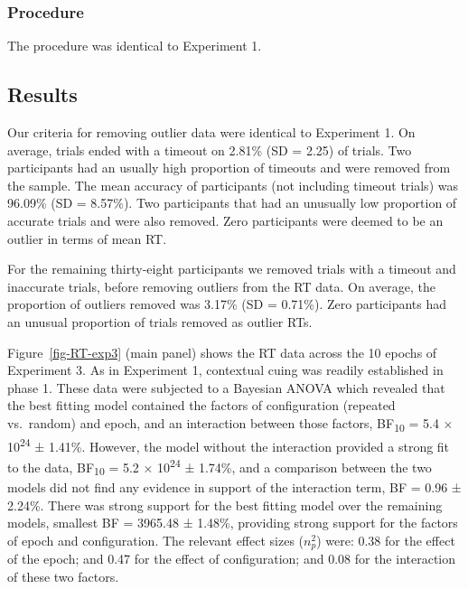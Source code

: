 \documentclass[
  man,
  floatsintext,
  longtable,
  nolmodern,
  notxfonts,
  notimes,
  colorlinks=true,linkcolor=blue,citecolor=blue,urlcolor=blue]{apa7}
\begin{document}
\subsubsection{Procedure}\label{procedure-2}

The procedure was identical to Experiment 1.

\subsection{Results}\label{results-2}

Our criteria for removing outlier data were identical to Experiment 1.
On average, trials ended with a timeout on 2.81\% (SD = 2.25) of trials.
Two participants had an usually high proportion of timeouts and were
removed from the sample. The mean accuracy of participants (not
including timeout trials) was 96.09\% (SD = 8.57\%). Two participants
that had an unusually low proportion of accurate trials and were also
removed. Zero participants were deemed to be an outlier in terms of mean
RT.

For the remaining thirty-eight participants we removed trials with a
timeout and inaccurate trials, before removing outliers from the RT
data. On average, the proportion of outliers removed was 3.17\% (SD =
0.71\%). Zero participants had an unusual proportion of trials removed
as outlier RTs.

Figure~\ref{fig-RT-exp3} (main panel) shows the RT data across the 10
epochs of Experiment 3. As in Experiment 1, contextual cuing was readily
established in phase 1. These data were subjected to a Bayesian ANOVA
which revealed that the best fitting model contained the factors of
configuration (repeated vs.~random) and epoch, and an interaction
between those factors, BF\textsubscript{10} = 5.4 ×
10\textsuperscript{24} ± 1.41\%. However, the model without the
interaction provided a strong fit to the data, BF\textsubscript{10} =
5.2 × 10\textsuperscript{24} ± 1.74\%, and a comparison between the two
models did not find any evidence in support of the interaction term, BF
= 0.96 ± 2.24\%. There was strong support for the best fitting model
over the remaining models, smallest BF = 3965.48 ± 1.48\%, providing
strong support for the factors of epoch and configuration. The relevant
effect sizes (\(n^2_p\)) were: 0.38 for the effect of the epoch; and
0.47 for the effect of configuration; and 0.08 for the interaction of
these two factors.
\end{document}
